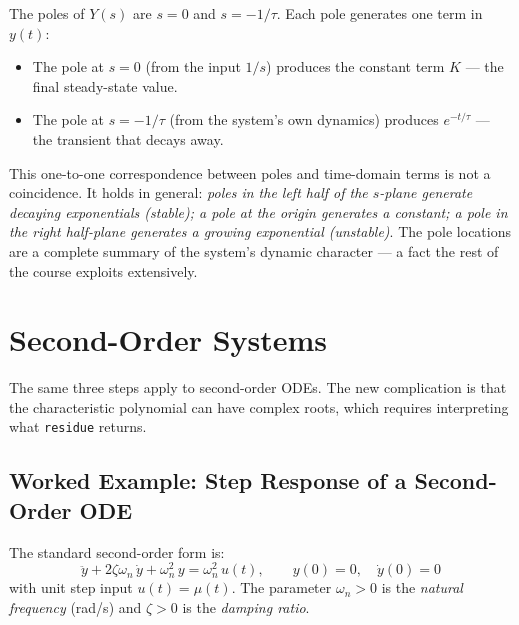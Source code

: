\documentclass[../../book.tex]{subfiles}
\begin{document}
The poles of $Y(s)$ are $s = 0$ and $s = -1/\tau$.  Each pole generates one
term in $y(t)$:

\begin{itemize}
  \item The pole at $s = 0$ (from the input $1/s$) produces the constant term
    $K$ --- the final steady-state value.
  \item The pole at $s = -1/\tau$ (from the system's own dynamics) produces
    $e^{-t/\tau}$ --- the transient that decays away.
\end{itemize}

This one-to-one correspondence between poles and time-domain terms is not a
coincidence.  It holds in general: \emph{poles in the left half of the
$s$-plane generate decaying exponentials (stable); a pole at the origin
generates a constant; a pole in the right half-plane generates a growing
exponential (unstable)}.  The pole locations are a complete summary of the
system's dynamic character --- a fact the rest of the course exploits
extensively.

\section{Second-Order Systems}
\label{sec:second_order}

The same three steps apply to second-order ODEs.  The new complication is that
the characteristic polynomial can have complex roots, which requires
interpreting what \texttt{residue} returns.

\subsection{Worked Example: Step Response of a Second-Order ODE}
\label{sec:so_example}

The standard second-order form is:
\begin{equation}
  \ddot{y} + 2\zeta\omega_n\,\dot{y} + \omega_n^2\,y = \omega_n^2\,u(t),
  \qquad y(0) = 0,\quad \dot{y}(0) = 0
  \label{eq:so_ode}
\end{equation}
with unit step input $u(t) = \mu(t)$.  The parameter $\omega_n > 0$ is the
\emph{natural frequency} (rad/s) and $\zeta > 0$ is the \emph{damping ratio}.
\end{document}
